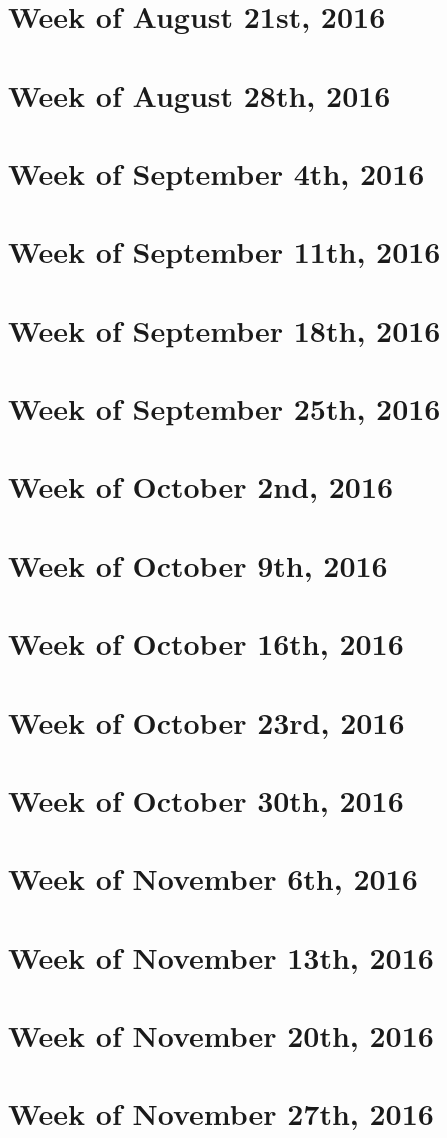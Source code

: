 \documentclass{article}
\begin{document}
\section{Week of August 21st, 2016}
\section{Week of August 28th, 2016}
\section{Week of September 4th, 2016}
\section{Week of September 11th, 2016}
\section{Week of September 18th, 2016}
\section{Week of September 25th, 2016}
\section{Week of October 2nd, 2016}
\section{Week of October 9th, 2016}
\section{Week of October 16th, 2016}
\section{Week of October 23rd, 2016}
\section{Week of October 30th, 2016}
\section{Week of November 6th, 2016}
\section{Week of November 13th, 2016}
\section{Week of November 20th, 2016}
\section{Week of November 27th, 2016}
\end{document}
